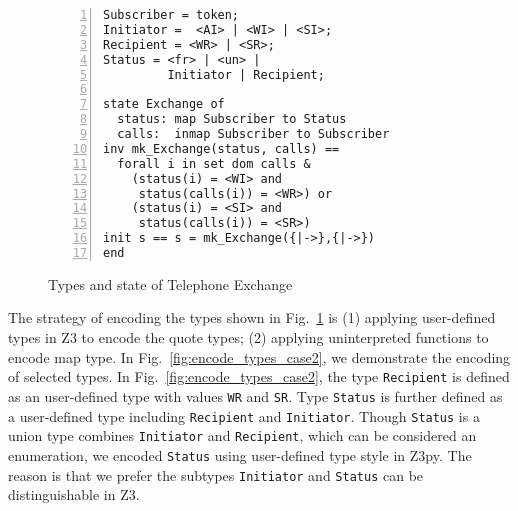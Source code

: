 \begin{figure}[t]
\begin{center}
\begin{mdframed}[roundcorner=5pt]
\begin{Verbatim}[fontsize=\small,numbers=left]
Subscriber = token;
Initiator =  <AI> | <WI> | <SI>;
Recipient = <WR> | <SR>;
Status = <fr> | <un> |
         Initiator | Recipient;
                                                                      
state Exchange of
  status: map Subscriber to Status
  calls:  inmap Subscriber to Subscriber
inv mk_Exchange(status, calls) == 
  forall i in set dom calls & 
    (status(i) = <WI> and
     status(calls(i)) = <WR>) or
    (status(i) = <SI> and
     status(calls(i)) = <SR>)
init s == s = mk_Exchange({|->},{|->})
end
\end{Verbatim}
\end{mdframed}
\vspace{-10pt}
\caption{Types and state of Telephone Exchange}
\label{fig:types_case2}
\end{center}
\vspace{-20pt}
\end{figure}

The strategy of encoding the types shown in Fig.~\ref{fig:types_case2} is (1) applying user-defined types in Z3 to encode the quote types; (2) applying uninterpreted functions to encode map type. In Fig.~\ref{fig:encode_types_case2}, we demonstrate the encoding of selected types. In Fig.~\ref{fig:encode_types_case2}, the type {\tt Recipient} is defined as an user-defined type with values {\tt WR} and {\tt SR}. Type {\tt Status} is further defined as a user-defined type including {\tt Recipient} and {\tt Initiator}. Though {\tt Status} is a union type combines {\tt Initiator} and {\tt Recipient}, which can be considered an enumeration, we encoded {\tt Status} using user-defined type style in Z3py. The reason is that we prefer the subtypes {\tt Initiator} and {\tt Status} can be distinguishable in Z3.

